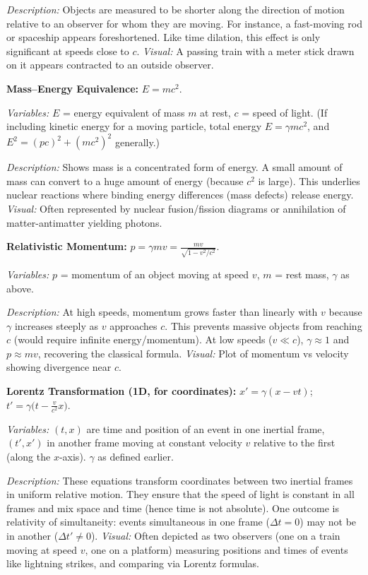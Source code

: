 \documentclass{article}
\begin{document}
\textit{Description:} Objects are measured to be shorter along the direction of motion relative to an observer for whom they are moving. For instance, a fast-moving rod or spaceship appears foreshortened. Like time dilation, this effect is only significant at speeds close to $c$. \textit{Visual:} A passing train with a meter stick drawn on it appears contracted to an outside observer.

\textbf{Mass–Energy Equivalence:} $E = m c^2$.

\textit{Variables:} $E$ = energy equivalent of mass $m$ at rest, $c$ = speed of light. (If including kinetic energy for a moving particle, total energy $E = \gamma m c^2$, and $E^2 = (pc)^2 + (m c^2)^2$ generally.)

\textit{Description:} Shows mass is a concentrated form of energy. A small amount of mass can convert to a huge amount of energy (because $c^2$ is large). This underlies nuclear reactions where binding energy differences (mass defects) release energy. \textit{Visual:} Often represented by nuclear fusion/fission diagrams or annihilation of matter-antimatter yielding photons.

\textbf{Relativistic Momentum:} $\displaystyle p = \gamma m v = \frac{m v}{\sqrt{1 - v^2/c^2}}$.

\textit{Variables:} $p$ = momentum of an object moving at speed $v$, $m$ = rest mass, $\gamma$ as above.

\textit{Description:} At high speeds, momentum grows faster than linearly with $v$ because $\gamma$ increases steeply as $v$ approaches $c$. This prevents massive objects from reaching $c$ (would require infinite energy/momentum). At low speeds ($v \ll c$), $\gamma \approx 1$ and $p \approx m v$, recovering the classical formula. \textit{Visual:} Plot of momentum vs velocity showing divergence near $c$.

\textbf{Lorentz Transformation (1D, for coordinates):} $x' = \gamma (x - v t)$;  $t' = \gamma \Big(t - \frac{v}{c^2} x\Big)$.

\textit{Variables:} $(t, x)$ are time and position of an event in one inertial frame, $(t', x')$ in another frame moving at constant velocity $v$ relative to the first (along the $x$-axis). $\gamma$ as defined earlier.

\textit{Description:} These equations transform coordinates between two inertial frames in uniform relative motion. They ensure that the speed of light is constant in all frames and mix space and time (hence time is not absolute). One outcome is relativity of simultaneity: events simultaneous in one frame ($\Delta t=0$) may not be in another ($\Delta t' \neq 0$). \textit{Visual:} Often depicted as two observers (one on a train moving at speed $v$, one on a platform) measuring positions and times of events like lightning strikes, and comparing via Lorentz formulas.
\end{document}
